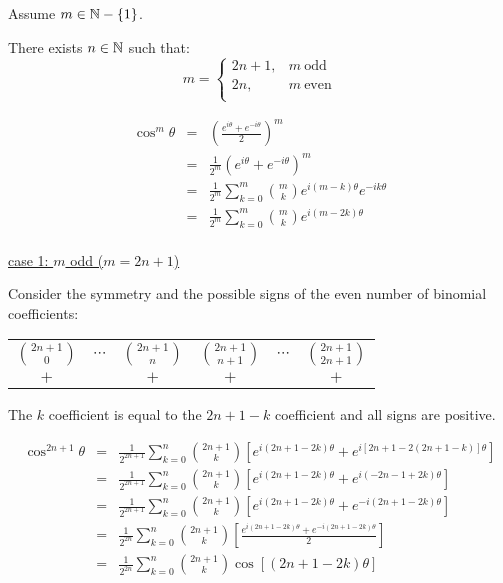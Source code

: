 \documentclass[letterpaper,12pt,fleqn]{article}
\renewcommand{\o}{\theta}
\begin{document}
\begin{theproof}
Assume $m\in\mathbb{N}-\{1\}$.

There exists $n\in\mathbb{N}$ such that:
\[m=\begin{cases}
    2n+1, & m\ \mbox{odd} \\
    2n, & m\ \mbox{even} \\
\end{cases}\]

\begin{eqnarray*}
\cos^m\o &=& \left(\frac{e^{i\o}+e^{-i\o}}{2}\right)^m \\
    &=& \frac{1}{2^m}\left(e^{i\o}+e^{-i\o}\right)^m \\
    &=& \frac{1}{2^m}\sum_{k=0}^m\binom{m}{k}e^{i(m-k)\o}e^{-ik\o} \\
    &=& \frac{1}{2^m}\sum_{k=0}^m\binom{m}{k}e^{i(m-2k)\o} \\
\end{eqnarray*}

\begin{description}
\item{\underline{case 1: $m$ odd ($m=2n+1$)}}

Consider the symmetry and the possible signs of the even number of binomial
coefficients:

\begin{tabular}{cccccc}
$\binom{2n+1}{0}$ & $\cdots$ & $\binom{2n+1}{n}$ &
    $\binom{2n+1}{n+1}$ & $\cdots$ & $\binom{2n+1}{2n+1}$ \\
$+$ & & $+$ & $+$ & & $+$ \\
\end{tabular}

The $k$ coefficient is equal to the $2n+1-k$ coefficient and all signs are
positive.

\begin{eqnarray*}
\cos^{2n+1}\o &=& \frac{1}{2^{2n+1}}\sum_{k=0}^n\binom{2n+1}{k}
        \left[e^{i(2n+1-2k)\o}+e^{i[2n+1-2(2n+1-k)]\o}\right] \\
    &=& \frac{1}{2^{2n+1}}\sum_{k=0}^n\binom{2n+1}{k}
        \left[e^{i(2n+1-2k)\o}+e^{i(-2n-1+2k)\o}\right] \\
    &=& \frac{1}{2^{2n+1}}\sum_{k=0}^n\binom{2n+1}{k}
        \left[e^{i(2n+1-2k)\o}+e^{-i(2n+1-2k)\o}\right] \\
    &=& \frac{1}{2^{2n}}\sum_{k=0}^n\binom{2n+1}{k}
        \left[\frac{e^{i(2n+1-2k)\o}+e^{-i(2n+1-2k)\o}}{2}\right] \\
    &=& \frac{1}{2^{2n}}\sum_{k=0}^n\binom{2n+1}{k}\cos[(2n+1-2k)\o] \\
\end{eqnarray*}


\end{description}
\end{theproof}
\end{document}
